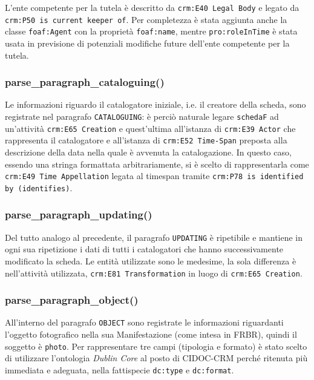 L'ente competente per la tutela è descritto da \texttt{crm:E40 Legal Body} e legato da \texttt{crm:P50 is current keeper of}. Per completezza è stata aggiunta anche la classe \texttt{foaf:Agent} con la proprietà \texttt{foaf:name}, mentre \texttt{pro:roleInTime} è stata usata in previsione di potenziali modifiche future dell'ente competente per la tutela.

\subsubsection{parse\_paragraph\_cataloguing()}
Le informazioni riguardo il catalogatore iniziale, i.e. il creatore della scheda, sono registrate nel paragrafo \texttt{CATALOGUING}: è perciò naturale legare \texttt{schedaF} ad un'attività \texttt{crm:E65 Creation} e quest'ultima all'istanza di \texttt{crm:E39 Actor} che rappresenta il catalogatore e all'istanza di \texttt{crm:E52 Time-Span} preposta alla descrizione della data nella quale è avvenuta la catalogazione. In questo caso, essendo una stringa formattata arbitrariamente, si è scelto di rappresentarla come \texttt{crm:E49 Time Appellation} legata al timespan tramite \texttt{crm:P78 is identified by (identifies)}.

\subsubsection{parse\_paragraph\_updating()}
Del tutto analogo al precedente, il paragrafo \texttt{UPDATING} è ripetibile e mantiene in ogni sua ripetizione i dati di tutti i catalogatori che hanno successivamente modificato la scheda. Le entità utilizzate sono le medesime, la sola differenza è nell'attività utilizzata, \texttt{crm:E81 Transformation} in luogo di \texttt{crm:E65 Creation}.
\subsubsection{parse\_paragraph\_object()}
All'interno del paragrafo \texttt{OBJECT} sono registrate le informazioni riguardanti l'oggetto fotografico nella sua Manifestazione (come intesa in FRBR), quindi il soggetto è \texttt{photo}. Per rappresentare tre campi (tipologia e formato) è stato scelto di utilizzare l'ontologia \emph{Dublin Core} al posto di CIDOC-CRM perché ritenuta più immediata e adeguata, nella fattispecie \texttt{dc:type} e \texttt{dc:format}.

